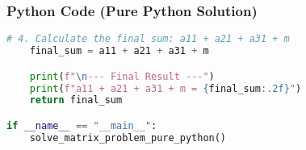 \documentclass{beamer}
\begin{document}
\begin{frame}[fragile]
\frametitle{Python Code (Pure Python Solution)}
\begin{lstlisting}[language=Python]
    # 4. Calculate the final sum: a11 + a21 + a31 + m
    final_sum = a11 + a21 + a31 + m

    print(f"\n--- Final Result ---")
    print(f"a11 + a21 + a31 + m = {final_sum:.2f}")
    return final_sum

if __name__ == "__main__":
    solve_matrix_problem_pure_python()
\end{lstlisting}
\end{frame}
\end{document}
